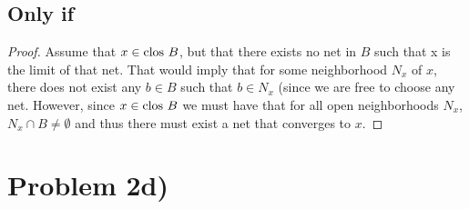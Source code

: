 \subsection*{Only if}
\begin{proof}
Assume that $x\in \text{clos } B$, but that there exists no net in $B$ such that x is the limit of that net. That would imply that for some neighborhood $N_x$ of $x$, there does not exist any $b\in B$ such that $b\in N_x$ (since we are free to choose any net. However, since $x\in \text{clos } B$ we must have that for all open neighborhoods $N_x$, $N_x\cap B\neq \emptyset$ and thus there must exist a net that converges to $x$. 
\end{proof} 
\section*{Problem 2d)}
